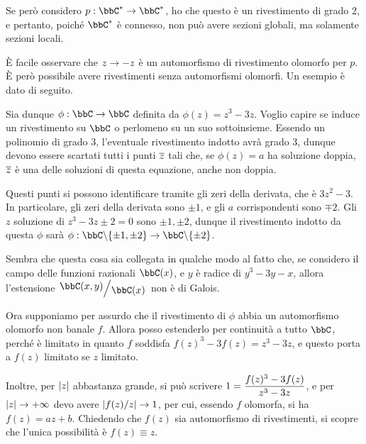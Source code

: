 Se però considero $p:\bbC^*\rar\bbC^*$, ho che questo è un rivestimento di grado $2$, e pertanto, poiché $\bbC^*$ è connesso, non può avere sezioni globali, ma solamente sezioni locali.

È facile osservare che $z\rightarrow-z$ è un automorfismo di rivestimento olomorfo per $p$. È però possibile avere rivestimenti senza automorfismi olomorfi. Un esempio è dato di seguito.

Sia dunque $\phi:\bbC\rar\bbC$ definita da $\phi(z)=z^3-3z$. Voglio capire se induce un rivestimento su $\bbC$ o perlomeno su un suo sottoinsieme.
Essendo un polinomio di grado $3$, l'eventuale rivestimento indotto avrà grado $3$, dunque devono essere scartati tutti i punti $\overline{z}$ tali che, se $\phi(z)=a$ ha soluzione doppia, $\overline{z}$ è una delle soluzioni di questa equazione, anche non doppia.

Questi punti si possono identificare tramite gli zeri della derivata, che è $3z^2-3$. In particolare, gli zeri della derivata sono $\pm1$, e gli $a$ corrispondenti sono $\mp2$. Gli $z$ soluzione di $z^3-3z\pm2=0$ sono $\pm1,\pm2$, dunque il rivestimento indotto da questa $\phi$ sarà $\phi:\bbC\minus\{\pm1,\pm2\}\rar\bbC\minus\{\pm2\}$.


Sembra che questa cosa sia collegata in qualche modo al fatto che, se considero il campo delle funzioni razionali $\bbC(x)$, e $y$ è radice di $y^3-3y-x$, allora l'estensione $\quotient{\bbC(x,y)}{\bbC(x)}$ non è di Galois.

Ora supponiamo per assurdo che il rivestimento di $\phi$ abbia un automorfismo olomorfo non banale $f$. Allora posso estenderlo per continuità a tutto $\bbC$, perché è limitato in quanto $f$ soddisfa $f(z)^3-3f(z)=z^3-3z$, e questo porta a $f(z)$ limitato se $z$ limitato.

Inoltre, per $\left| z \right|$ abbastanza grande, si può scrivere $\displaystyle 1=\frac{f(z)^3-3f(z)}{z^3-3z}$, e per $\left| z \right|\rightarrow+\infty$ devo avere $\left| f(z)/z \right|\rightarrow1$, per cui, essendo $f$ olomorfa, si ha $f(z)=az+b$. Chiedendo che $f(z)$ sia automorfismo di rivestimenti, si scopre che l'unica possibilità è $f(z)\equiv z$.

